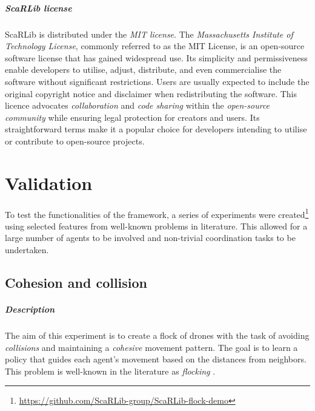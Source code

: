 \documentclass[12pt,a4paper,openright,twoside]{book}
\begin{document}
\paragraph{ScaRLib license} 
ScaRLib is distributed under the \emph{MIT license}. 
The \emph{Massachusetts Institute of Technology License}, commonly referred to as the MIT License, is an open-source software license 
    that has gained widespread use. Its simplicity and permissiveness enable developers to utilise, adjust, distribute, and even 
    commercialise the software without significant restrictions. Users are usually expected to include the original copyright notice 
    and disclaimer when redistributing the software. This licence advocates \emph{collaboration} and \emph{code sharing} 
    within the \emph{open-source community} while ensuring legal protection for creators and users. Its straightforward terms make it a 
    popular choice for developers intending to utilise or contribute to open-source projects.

\chapter{Validation} 
\label{chap:validation}
To test the functionalities of the framework, a series of experiments were created\footnote{\url{https://github.com/ScaRLib-group/ScaRLib-flock-demo}} 
    using selected features from well-known problems in literature. This allowed for a large number of 
    agents to be involved and non-trivial coordination tasks to be undertaken.

\section{Cohesion and collision}

\paragraph{Description}
The aim of this experiment is to create a flock of drones with the task of avoiding \emph{collisions}
    and maintaining a \emph{cohesive} movement pattern. The goal is to learn a policy that guides each
    agent's movement based on the distances from neighbors.
    This problem is well-known in the literature as \emph{flocking} \cite{DBLP:conf/siggraph/Reynolds87,inverserl}.
\end{document}
